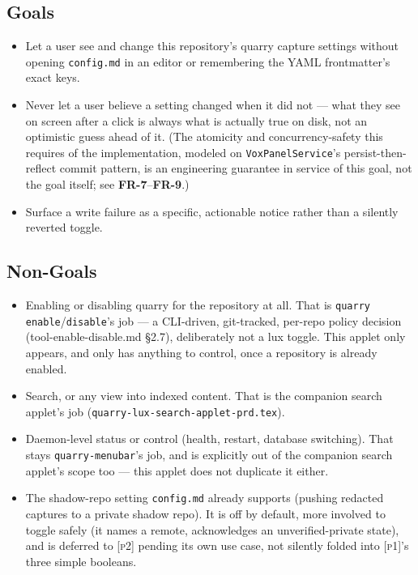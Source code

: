 \documentclass[a4paper,11pt]{report}
\newcommand{\fr}[1]{\textbf{FR-#1}}
\newcommand{\pone}{\textsc{[p1]}}
\newcommand{\ptwo}{\textsc{[p2]}}
\begin{document}
\subsection{Goals}

\begin{itemize}
  \item Let a user see and change this repository's quarry capture
    settings without opening \texttt{config.md} in an editor or
    remembering the YAML frontmatter's exact keys.
  \item Never let a user believe a setting changed when it did not ---
    what they see on screen after a click is always what is actually
    true on disk, not an optimistic guess ahead of it. (The atomicity
    and concurrency-safety this requires of the implementation, modeled
    on \texttt{VoxPanelService}'s persist-then-reflect commit pattern, is
    an engineering guarantee in service of this goal, not the goal
    itself; see \fr{7}--\fr{9}.)
  \item Surface a write failure as a specific, actionable notice rather
    than a silently reverted toggle.
\end{itemize}

\subsection{Non-Goals}
\label{sec:scope}

\begin{itemize}
  \item Enabling or disabling quarry for the repository at all. That is
    \texttt{quarry enable}/\texttt{disable}'s job --- a CLI-driven,
    git-tracked, per-repo policy decision (tool-enable-disable.md
    \S2.7), deliberately not a lux toggle. This applet only appears, and
    only has anything to control, once a repository is already enabled.
  \item Search, or any view into indexed content. That is the companion
    search applet's job (\texttt{quarry-lux-search-applet-prd.tex}).
  \item Daemon-level status or control (health, restart, database
    switching). That stays \texttt{quarry-menubar}'s job, and is
    explicitly out of the companion search applet's scope too --- this
    applet does not duplicate it either.
  \item The shadow-repo setting \texttt{config.md} already supports
    (pushing redacted captures to a private shadow repo). It is off by
    default, more involved to toggle safely (it names a remote,
    acknowledges an unverified-private state), and is deferred to
    \ptwo{} pending its own use case, not silently folded into \pone{}'s
    three simple booleans.
\end{itemize}
\end{document}
